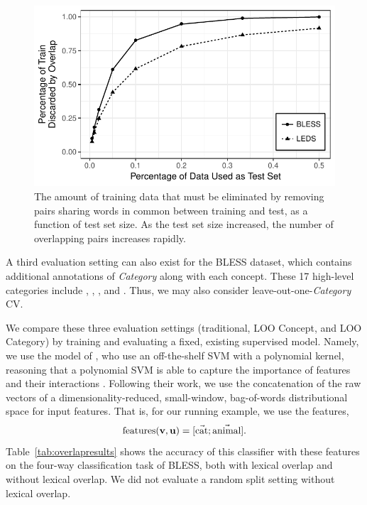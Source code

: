 \begin{figure}
  \centering
  \includegraphics{plots/foldloss}
  \caption{The amount of training data that must be eliminated by removing pairs
    sharing words in common between training and test, as a function of test
    set size. As the test set size increased, the number of overlapping pairs
    increases rapidly.}
  \label{fig:dataloss}
\end{figure}

A third evaluation setting can also exist for the BLESS dataset, which contains
additional annotations of {\em Category} along with each concept. These
17 high-level categories include , ,
,  and . Thus,
we may also consider leave-out-one-{\em Category} CV.

We compare these three evaluation settings (traditional, LOO Concept, and LOO
Category) by training and evaluating a fixed, existing supervised model.
Namely, we use the model of , who use an
off-the-shelf SVM with a polynomial kernel, reasoning that a polynomial SVM is
able to capture the importance of features and their interactions
\cite{cortes:1995:ml}. Following their work, we use the concatenation of the
raw vectors of a dimensionality-reduced, small-window, bag-of-words
distributional space for input features. That is, for our running
example, we use the features,
\begin{equation*}
  \mbox{features}({\mathbf{v}}, {\mathbf{u}}) = [\vec{\mbox{cat}}; \vec{\mbox{animal}}].
\end{equation*}
Table~\ref{tab:overlapresults} shows the accuracy of this
classifier with these features on the four-way classification task
of BLESS, both with lexical overlap and without lexical overlap. We did not
evaluate a random split setting without lexical overlap.

